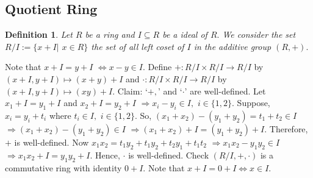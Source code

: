 \documentclass[11pt]{amsart}
\newtheorem{definition}[theorem]{Definition}%
\begin{document}
\subsection{Quotient Ring}
\begin{definition}
Let $R$ be a ring and $I\subseteq R$ be a ideal of $R.$ We consider the set $R/I:=\{x+I|$ $x\in R \}$ the set of all left coset of $I$ in the additive group $(R,+).$
\end{definition}
Note that $x+I=y+I$ $\Leftrightarrow x-y \in I.$
\newline Define $+:R/I\times R/I \rightarrow R/I$ by $(x+I,y+I) \mapsto (x+y)+I$ and $\cdot :R/I\times R/I \rightarrow R/I$ by $(x+I,y+I) \mapsto (xy)+I.$ 
\newline Claim: `$+,$' and `$\cdot $' are well-defined. Let $x_{1}+I=y_{1}+I$ and $x_{2}+I=y_{2}+I$ $\Rightarrow x_{i}-y_{i} \in I,$ $i\in \{1,2 \}.$ Suppose, $x_{i}=y_{i}+t_{i}$ where $t_{i} \in I,$ $i\in \{1,2 \}.$ So, $(x_{1}+x_{2})-(y_{1}+y_{2})=t_{1}+t_{2}\in I$ $\Rightarrow (x_{1}+x_{2})-(y_{1}+y_{2}) \in I$ $\Rightarrow (x_{1}+x_{2})+I=(y_{1}+y_{2})+I.$ Therefore, $+$ is well-defined. Now $x_{1}x_{2}=t_{1}y_{2}+t_{1}y_{2}+t_{2}y_{1}+t_{1}t_{2}$ $\Rightarrow x_{1}x_{2}-y_{1}y_{2} \in I$ $\Rightarrow  x_{1}x_{2}+I=y_{1}y_{2}+I.$ Hence, $\cdot$ is well-defined.
\newline Check $(R/I,+,\cdot )$ is a commutative ring with identity $0+I.$ Note that $x+I=0+I \Leftrightarrow x\in I.$
\end{document}
